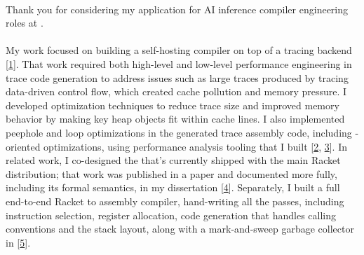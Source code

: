

\newcommand{\dissertationurl}{https://github.com/cderici/dissertation/releases/download/latest-pdf/thesis.pdf}
\newcommand{\pycketperfurl}{https://github.com/cderici/pycket-performance}
\newcommand{\tracedrawurl}{https://github.com/cderici/trace-draw}
\newcommand{\raxurl}{https://github.com/cderici/rax}
\newcommand{\icfpreporturl}{https://dl.acm.org/doi/10.1145/3341642}
\newcommand{\atwurl}{https://github.com/cderici/around-the-world-in-26-languages}
\newcommand{\homelaburl}{https://home.dericilab.live/homelab/}

\newcommand{\cairolang}{https://github.com/cderici/around-the-world-in-compilers/blob/main/langs/cairo/README.md}
\newcommand{\dublinlang}{https://github.com/cderici/around-the-world-in-compilers/blob/main/langs/dublin/README.md}
\newcommand{\edinlang}{https://github.com/cderici/around-the-world-in-compilers/blob/main/langs/edinburgh/README.md}





\paragraph{} %
Thank you for considering my application for AI inference compiler engineering roles at .

\paragraph{} %
My  work focused on building a self-hosting compiler on top of a tracing  backend [\href{\dissertationurl}{1}]. That work required both high-level and low-level performance engineering in trace code generation to address issues such as large traces produced by tracing data-driven control flow, which created cache pollution and memory pressure. I developed optimization techniques to reduce trace size and improved memory behavior by making key heap objects fit within  cache lines. I also implemented peephole and loop optimizations in the generated trace assembly code, including -oriented optimizations, using performance analysis tooling that I built [\href{\pycketperfurl}{2}, \href{\tracedrawurl}{3}]. In related work, I co-designed the  that's currently shipped with the main Racket distribution; that work was published in a paper and documented more fully, including its formal semantics, in my dissertation [\href{\icfpreporturl}{4}]. Separately, I built a full end-to-end Racket to  assembly compiler, hand-writing all the passes, including instruction selection, register allocation, code generation that handles calling conventions and the stack layout, along with a mark-and-sweep garbage collector in  [\href{\raxurl}{5}].

